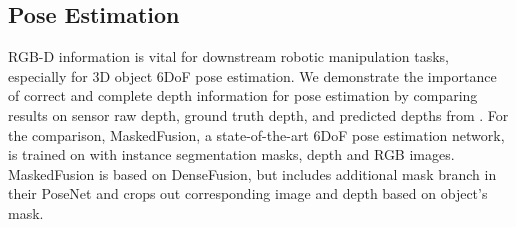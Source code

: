 \subsection{Pose Estimation}
RGB-D information is vital for downstream robotic manipulation tasks, especially for 3D object 6DoF pose estimation. We demonstrate the importance of correct and complete depth information for pose estimation by comparing results on sensor raw depth, ground truth depth, and predicted depths from \algoName. For the comparison, MaskedFusion\citep{maskedfusion}, a state-of-the-art 6DoF pose estimation network, is trained on \dataName with instance segmentation masks, depth and RGB images. MaskedFusion is based on DenseFusion\citep{densefusion}, but includes additional mask branch in their PoseNet\citep{maskedfusion} and crops out corresponding image and depth based on object's mask. 


\begin{table}[!b]
    \centering
    \caption{\textbf{Pose Estimation}: Quantitative evaluation of MaskedFusion~\cite{maskedfusion} 6DoF pose using the ADD metric on the
\dataName dataset using raw, ground truth and \algoName predicted depth.}
    
    \label{tab:masked_fusion}
\end{table}




